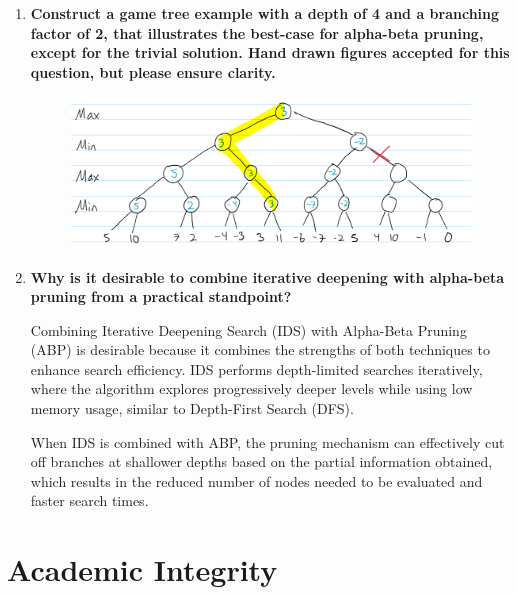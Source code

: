 \documentclass[a4paper]{article}
\begin{document}
\begin{sloppypar}
\begin{enumerate}[start=12,label=Q\arabic*,left=0pt]
    \item \textbf{Construct a game tree example with a depth of 4 and a branching factor of 2, that illustrates the best-case for alpha-beta pruning, except for the trivial solution. Hand drawn figures accepted for this question, but please ensure clarity.}
    \begin{figure}[H]
        \centering  
        \includegraphics[height=0.2\textheight]{Q12_tree.png}
        \label{fig:Q12_tree}
    \end{figure}

    \item \textbf{Why is it desirable to combine iterative deepening with alpha-beta pruning from a practical standpoint?}
    \par Combining Iterative Deepening Search (IDS) with Alpha-Beta Pruning (ABP) is desirable because it combines the strengths 
    of both techniques to enhance search efficiency. IDS performs depth-limited searches iteratively, where the algorithm explores 
    progressively deeper levels while using low memory usage, similar to Depth-First Search (DFS). 
    
    When IDS is combined with ABP, the pruning mechanism can effectively cut off branches at shallower depths based on the partial 
    information obtained, which results in the reduced number of nodes needed to be evaluated and faster search times.

\end{enumerate}

\section{Academic Integrity}


\end{sloppypar}
\end{document}
